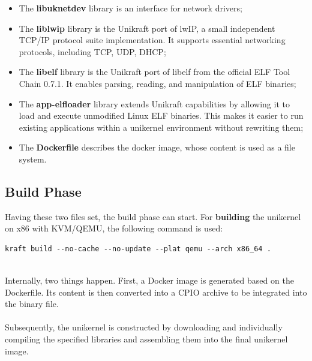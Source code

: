 \begin{itemize}
    \item The \textbf{libuknetdev} library is an interface for network drivers;
    \item The \textbf{liblwip} library is the Unikraft port of lwIP\cite{lwip-github}, a small independent TCP/IP protocol suite implementation. It supports essential networking protocols, including TCP, UDP, DHCP;
    \item The \textbf{libelf} library is the Unikraft port of libelf from the official ELF Tool Chain 0.7.1\cite{elftoolchain-sourceforge}. It enables parsing, reading, and manipulation of ELF binaries;
    \item The \textbf{app-elfloader}\cite{unikraft-app-elfloader} library extends Unikraft capabilities by allowing it to load and execute unmodified Linux ELF binaries. This makes it easier to run existing applications within a unikernel environment without rewriting them;
    \item The \textbf{Dockerfile} describes the docker image, whose content is used as a file system.
\end{itemize}
\newpage
\subsection{Build Phase}
Having these two files set, the build phase can start. For \textbf{building} the unikernel on x86 with KVM/QEMU, the following command is used:
\\
\lstset{caption=Build the OpenArena server, language=C}
\begin{lstlisting}
kraft build --no-cache --no-update --plat qemu --arch x86_64 .
\end{lstlisting}
\\
Internally, two things happen. First, a Docker image is generated based on the Dockerfile. Its content is then converted into a CPIO archive to be integrated into the binary file. \\ \\
Subsequently, the unikernel is constructed by downloading and individually compiling the specified libraries and assembling them into the final unikernel image.
